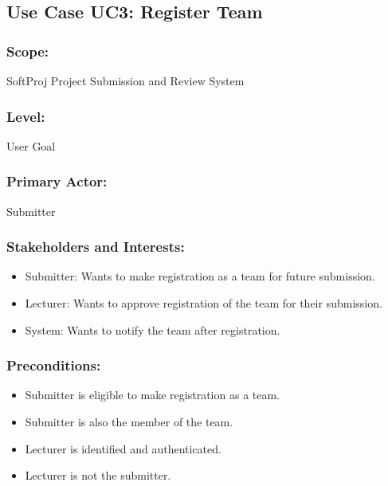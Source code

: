 \newpage



    
    
    
    
    
    
     \subsection*{Use Case UC3: Register Team}
    \subsubsection*{Scope:} SoftProj Project Submission and Review System
    \subsubsection*{\textbf{Level:} }User Goal
    \subsubsection*{\textbf{Primary Actor:} } Submitter
    \subsubsection*{\textbf{Stakeholders and Interests:}}
    \begin{itemize}
    \itemsep-1em 
        \item Submitter: Wants to make registration as a team for future submission.
        \item Lecturer: Wants to approve registration of the team for their submission.
         \item System: Wants to notify the team after registration.
    \end{itemize}
    
    
    \subsubsection*{\textbf{Preconditions:}}
    \begin{itemize}
    \itemsep-1em 
        \item Submitter is eligible to make registration as a team.
        \item Submitter is also the member of the team.
         \item Lecturer is identified and authenticated.
        \item Lecturer is not the submitter.
    \end{itemize}
    
